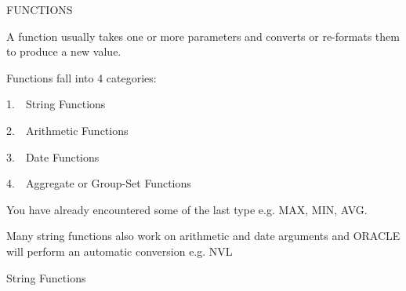 FUNCTIONS

A function usually takes one or more parameters and converts or re-formats them to produce a new value.

Functions fall into 4 categories:

1.\ \ String Functions

2.\ \ Arithmetic Functions

3.\ \ Date Functions

4.\ \ Aggregate or Group-Set Functions

You have already encountered some of the last type e.g. MAX, MIN, AVG.  

Many string functions also work on arithmetic and date arguments and ORACLE will perform an automatic conversion e.g. NVL 

String Functions

